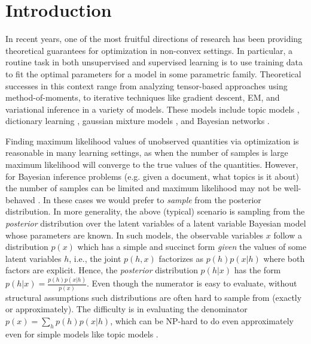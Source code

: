 \section{Introduction}

In recent years, one of the most fruitful directions of research has been providing theoretical guarantees for optimization in non-convex settings. In particular, a routine task in both unsupervised and supervised learning  is to use training data to fit the optimal parameters for a model in some parametric family. Theoretical successes in this context range from analyzing tensor-based approaches using method-of-moments, to iterative techniques like gradient descent, EM, and variational inference 
in a variety of models. These models include topic models \cite{anandkumar2012spectral, arora2012topic, arora2013practical, awasthi2015some}, dictionary learning \cite{arora2015simple, agarwal2014learning}, gaussian mixture models \cite{hsu2013learning}, and Bayesian networks \cite{arora2016provable}. 


Finding maximum likelihood values of unobserved quantities via optimization is reasonable in many learning settings, as when the number of samples is large maximum likelihood will converge to the true values of the quantities. However, for Bayesian inference problems (e.g. given a document, what topics is it about) the number of samples can be limited and maximum likelihood may not be well-behaved \cite{sontag2011complexity}. In these cases we would prefer to {\em sample} from the posterior distribution.  %
In more generality, the above (typical) scenario is sampling from the \emph{posterior} distribution over the latent variables of a latent variable Bayesian model whose parameters are known. In such models, the observable variables $x$ follow a distribution $p(x)$ which has a simple and succinct form \emph{given} the values of some latent variables $h$, i.e., the joint $p(h,x)$ factorizes as $p(h) p(x|h)$ where both factors are explicit. Hence, the \emph{posterior} distribution $p(h|x) $ has the form $p(h|x) = \frac{p(h) p(x|h)}{p(x)}$. Even though the numerator is easy to evaluate,
without structural assumptions such distributions are often hard to sample from (exactly or approximately). The difficulty is in evaluating the denominator $p(x)=\sum_h p(h)p(x|h)$, which can be NP-hard to do even approximately even for simple models like topic models \cite{sontag2011complexity}.

